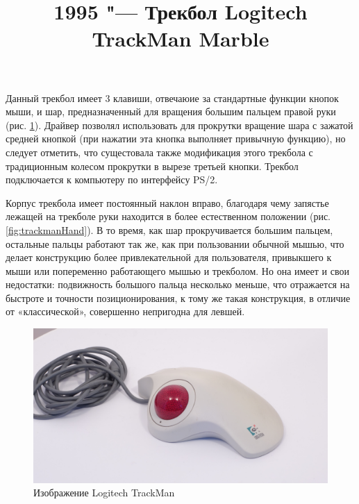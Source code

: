 \documentclass[11pt, a4paper]{article}
\begin{document}
\title{1995 "--- Трекбол Logitech TrackMan Marble}

\maketitle

Данный трекбол имеет 3 клавиши, отвечаюие за стандартные функции кнопок мыши, и шар, предназначенный для вращения большим пальцем правой руки (рис. \ref{fig:trackman}). Драйвер позволял использовать для прокрутки вращение шара с зажатой средней кнопкой (при нажатии эта кнопка выполняет привычную функцию), но следует отметить, что сущестовала также модификация этого трекбола с традиционным колесом прокрутки в вырезе третьей кнопки.
Трекбол подключается к компьютеру по интерфейсу PS/2.

Корпус трекбола имеет постоянный наклон вправо, благодаря чему запястье лежащей на трекболе руки находится в более естественном положении (рис. \ref{fig:trackmanHand}). В то время, как шар прокручивается большим пальцем, остальные пальцы работают так же, как при пользовании обычной мышью, что делает конструкцию более привлекательной для пользователя, привыкшего к мыши или попеременно работающего мышью и трекболом. Но она имеет и свои недостатки: подвижность большого пальца несколько меньше, что отражается на быстроте и точности позиционирования, к тому же такая конструкция, в отличие от «классической», совершенно непригодна для левшей.

\begin{figure}[h]
    \centering
    \includegraphics[scale=0.3]{1995_logitech_trackman/2.15.JPG}
    \caption{Изображение Logitech TrackMan}
    \label{fig:trackman}
\end{figure}
\end{document}
